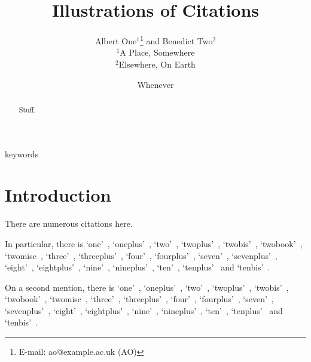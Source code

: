 \documentclass[useAMS,usenatbib]{mn2e}
\title[Illustrations of Citations]{Illustrations of Citations}
\author[Albert One and Benedict Two]{Albert One$^{1}$\thanks{E-mail:
ao@example.ac.uk (AO)} and Benedict Two$^{2}$\\
$^{1}$A Place, Somewhere\\
$^{2}$Elsewhere, On Earth}
\begin{document}
\date{Whenever}

\pagerange{\pageref{firstpage}--\pageref{lastpage}} 

\maketitle

\label{firstpage}

\begin{abstract}
Stuff.
\end{abstract}

\begin{keywords}
keywords
\end{keywords}

\section{Introduction}

There are numerous citations here.

In particular, there is
`one'~\citep{one},
`oneplus'~\citep{oneplus},
`two'~\citep{two},
`twoplus'~\citep{twoplus},
`twobis'~\citep{twobis},
`twobook'~\citep{twobook},
`twomisc~\citep{twomisc},
`three'~\citep{three},
`threeplus'~\citep{threeplus},
`four'~\citep{four},
`fourplus'~\citep{fourplus},
`seven'~\citep{seven},
`sevenplus'~\citep{sevenplus},
`eight'~\citep{eight},
`eightplus'~\citep{eightplus},
`nine'~\citep{nine},
`nineplus'~\citep{nineplus},
`ten'~\citep{ten},
`tenplus'~\citep{tenplus} and
`tenbis'~\citep{tenbis}.

On a second mention, there is
`one'~\citep{one},
`oneplus'~\citep{oneplus},
`two'~\citep{two},
`twoplus'~\citep{twoplus},
`twobis'~\citep{twobis},
`twobook'~\citep{twobook},
`twomisc~\citep{twomisc},
`three'~\citep{three},
`threeplus'~\citep{threeplus},
`four'~\citep{four},
`fourplus'~\citep{fourplus},
`seven'~\citep{seven},
`sevenplus'~\citep{sevenplus},
`eight'~\citep{eight},
`eightplus'~\citep{eightplus},
`nine'~\citep{nine},
`nineplus'~\citep{nineplus},
`ten'~\citep{ten},
`tenplus'~\citep{tenplus} and
`tenbis'~\citep{tenbis}.





\bsp

\label{lastpage}
\end{document}
